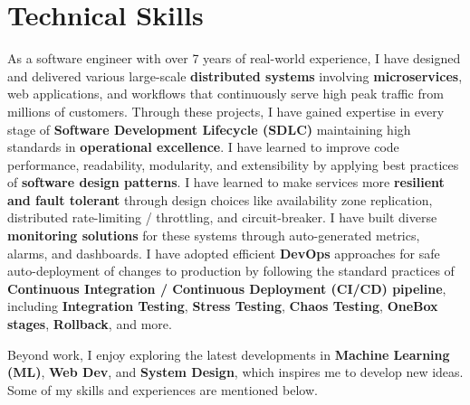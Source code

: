 %
\vspace{-10pt}
\section{Technical Skills}
\vspace{3pt}
As a software engineer with over 7 years of real-world experience, I have designed and delivered various large-scale \textbf{distributed systems} involving \textbf{microservices}, web applications, and workflows that continuously serve high peak traffic from millions of customers. Through these projects, I have gained expertise in every stage of \textbf{Software Development Lifecycle (SDLC)} maintaining high standards in \textbf{operational excellence}. I have learned to improve code performance, readability, modularity, and extensibility by applying best practices of \textbf{software design patterns}. I have learned to make services more \textbf{resilient and fault tolerant} through design choices like availability zone replication, distributed rate-limiting / throttling, and circuit-breaker. I have built diverse \textbf{monitoring solutions} for these systems through auto-generated metrics, alarms, and dashboards. I have adopted efficient \textbf{DevOps} approaches for safe auto-deployment of changes to production by following the standard practices of \textbf{Continuous Integration / Continuous Deployment (CI/CD) pipeline}, including \textbf{Integration Testing}, \textbf{Stress Testing}, \textbf{Chaos Testing}, \textbf{OneBox stages}, \textbf{Rollback}, and more.
\par\vspace{2pt} 
Beyond work, I enjoy exploring the latest developments in \textbf{Machine Learning (ML)}, \textbf{Web Dev}, and \textbf{System Design}, which inspires me to develop new ideas. Some of my skills and experiences are mentioned below.



